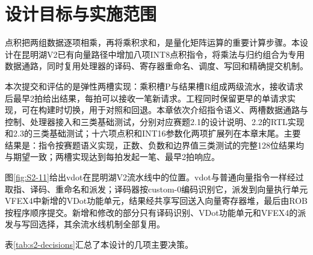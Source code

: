 \renewcommand{\stagefigureprefix}{2}\setcounter{figure}{0}

\section{设计目标与实施范围}
点积把两组数据逐项相乘，再将乘积求和，是量化矩阵运算的重要计算步骤。本设计在昆明湖V2已有向量路径中增加八项INT8点积指令，将乘法与归约组合为专用数据通路，同时复用处理器的译码、寄存器重命名、调度、写回和精确提交机制。

本次提交和评估的是弹性两槽实现：乘积槽P与结果槽R组成两级流水，接收请求后最早2拍给出结果，每拍可以接收一笔新请求。工程同时保留更早的单请求实现，可在构建时切换，用于对照和回退。本章依次介绍指令语义、两槽数据通路与控制、处理器接入和三类基础测试，分别对应赛题2.1的设计说明、2.2的RTL实现和2.3的三类基础测试；十六项点积和INT16参数化两项扩展列在本章末尾。主要结果是：指令按赛题语义实现，正数、负数和边界值三类测试的完整128位结果均与期望一致；两槽实现达到每拍发起一笔、最早2拍响应。

图\ref{fig:S2-11}给出vdot在昆明湖V2流水线中的位置。vdot与普通向量指令一样经过取指、译码、重命名和派发；译码器按custom-0编码识别它，派发到向量执行单元VFEX4中新增的VDot功能单元，结果经共享写回送入向量寄存器堆，最后由ROB按程序顺序提交。新增和修改的部分只有译码识别、VDot功能单元和VFEX4的派发与写回选择，其余流水线机制全部复用。


表\ref{tab:s2-decisions}汇总了本设计的几项主要决策。

